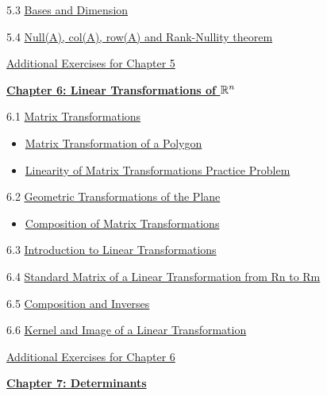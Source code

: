 \documentclass{ximera}
\begin{document}
5.3	\href{https://ximera.osu.edu/linearalgebradzv3/LinearAlgebraInteractiveIntro/VSP-0035/main}{Bases and Dimension}
	
5.4	\href{https://ximera.osu.edu/linearalgebradzv3/LinearAlgebraInteractiveIntro/VSP-0040/main}{Null(A), col(A), row(A) and Rank-Nullity theorem}
	
\href{https://ximera.osu.edu/linearalgebradzv3/LinearAlgebraInteractiveIntro/SUPX-0050/main}{Additional Exercises for Chapter 5}
	
\href{https://ximera.osu.edu/linearalgebradzv3/LinearAlgebraInteractiveIntro/XLAChapter_linTrans/main}{\textbf{Chapter 6: Linear Transformations of $\mathbb{R}^n$}}
	
6.1	\href{https://ximera.osu.edu/linearalgebradzv3/LinearAlgebraInteractiveIntro/LTR-0005/main}{Matrix Transformations}
\begin{itemize}
    \item 
    \href{https://www.geogebra.org/m/cvxdwput}{Matrix Transformation of a Polygon}
    \item
    \href{https://www.geogebra.org/m/nhs3wnqd}{Linearity of Matrix Transformations Practice Problem}
\end{itemize}
	
6.2	\href{https://ximera.osu.edu/linearalgebradzv3/LinearAlgebraInteractiveIntro/LTR-0070/main}{Geometric Transformations of the Plane}
\begin{itemize}
    \item 
    \href{https://www.geogebra.org/m/d6jyt85s}{Composition of Matrix Transformations}
\end{itemize}
	
6.3	\href{https://ximera.osu.edu/linearalgebradzv3/LinearAlgebraInteractiveIntro/LTR-0010/main}{Introduction to Linear Transformations}
	
6.4	\href{https://ximera.osu.edu/linearalgebradzv3/LinearAlgebraInteractiveIntro/LTR-0020/main}{Standard Matrix of a Linear Transformation from Rn to Rm}
	
6.5	\href{https://ximera.osu.edu/linearalgebradzv3/LinearAlgebraInteractiveIntro/LTR-0030/main}{Composition and Inverses}
	
6.6	\href{https://ximera.osu.edu/linearalgebradzv3/LinearAlgebraInteractiveIntro/LTR-0050/main}{Kernel and Image of a Linear Transformation}
	
\href{https://ximera.osu.edu/linearalgebradzv3/LinearAlgebraInteractiveIntro/SUPX-0060/main}{Additional Exercises for Chapter 6}
	
\href{https://ximera.osu.edu/linearalgebradzv3/LinearAlgebraInteractiveIntro/XLAChapter_det/main}{\textbf{Chapter 7: Determinants}}
	
\end{document}
